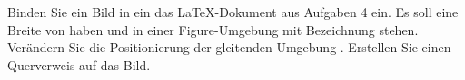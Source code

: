 Binden Sie ein Bild in ein das \LaTeX-Dokument aus Aufgaben 4 ein. Es soll eine Breite von \keyword{6 cm} haben und in einer Figure-Umgebung mit Bezeichnung stehen. Verändern Sie die Positionierung der gleitenden Umgebung . Erstellen Sie einen Querverweis auf das Bild.